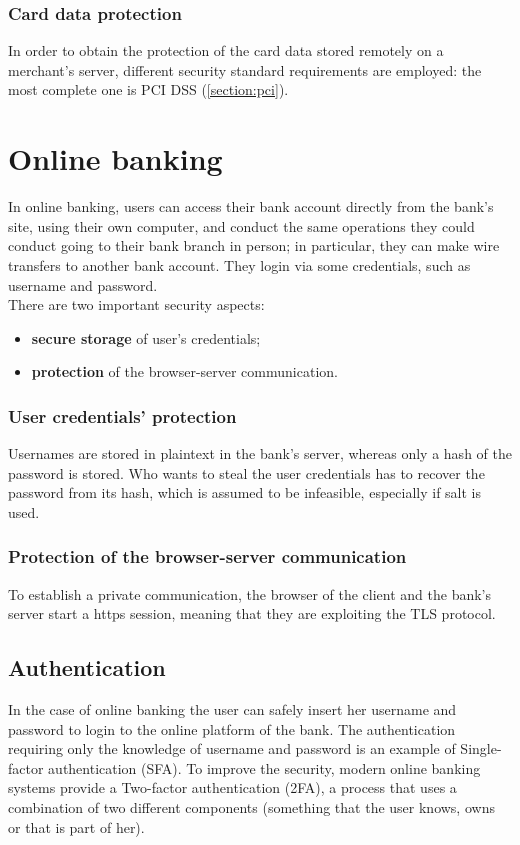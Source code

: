 \documentclass[a4paper, 10pt, titlepage]{article}
\begin{document}
\subsubsection*{Card data protection}
In order to obtain the protection of the card data stored remotely on a merchant's server, different security standard requirements are employed: the most complete one is PCI DSS (\ref{section:pci}).


\section{Online banking}
In online banking, users can access their bank account directly from the bank's site, using their own computer, and conduct the same operations they could conduct going to their bank branch in person; in particular, they can make wire transfers to another bank account. They login via some credentials, such as username and password. \\
There are two important security aspects:
\begin{itemize}
\item \textbf{secure storage} of user's credentials;
\item \textbf{protection} of the browser-server communication.
\end{itemize}

\subsubsection*{User credentials' protection}
Usernames are stored in plaintext in the bank's server, whereas only a hash of the password is stored. Who wants to steal the user credentials has to recover the password from its hash, which is assumed to be infeasible, especially if salt is used.

\subsubsection*{Protection of the browser-server communication}
To establish a private communication, the browser of the client and the bank's server start a https session, meaning that they are exploiting the TLS protocol. 

\subsection{Authentication}
In the case of online banking the user can safely insert her username and password to login to the online platform of the bank. 
The authentication requiring only the knowledge of username and password is an example of Single-factor authentication (SFA). To improve the security, modern online banking systems provide a Two-factor authentication (2FA), a process that uses a combination of two different components (something that the user knows, owns or that is part of her). 
\end{document}
